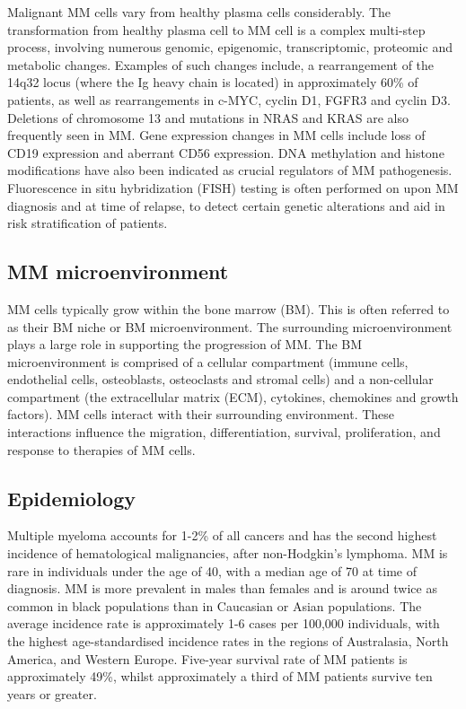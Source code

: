 Malignant MM cells vary from healthy plasma cells considerably.
The transformation from healthy plasma cell to MM cell is a complex multi-step process, involving numerous genomic, epigenomic, transcriptomic, proteomic and metabolic changes\cite{de2002comparison, caprio2020epigenetic, chanukuppa2021proteomic, el2018metabolic}.
Examples of such changes include, a rearrangement of the 14q32 locus (where the Ig heavy chain is located)\cite{nishida1997ig} in approximately 60\% of patients, as well as rearrangements in c-MYC, cyclin D1, FGFR3 and cyclin D3\cite{de2002comparison}.
Deletions of chromosome 13 and mutations in NRAS and KRAS are also frequently seen in MM\@.
Gene expression changes in MM cells include loss of CD19 expression and aberrant CD56 expression.
DNA methylation and histone modifications have also been indicated as crucial regulators of MM pathogenesis.
Fluorescence in situ hybridization (FISH) testing is often performed on upon MM diagnosis and at time of relapse, to detect certain genetic alterations and aid in risk stratification of patients\cite{swerdlow2008classification}.

\subsection{MM microenvironment}
MM cells typically grow within the bone marrow (BM).
This is often referred to as their BM niche or BM microenvironment.
The surrounding microenvironment plays a large role in supporting the progression of MM.
The BM microenvironment is comprised of a cellular compartment (immune cells, endothelial cells, osteoblasts, osteoclasts and stromal cells) and a non-cellular compartment (the extracellular matrix (ECM), cytokines, chemokines and growth factors)\cite{manier2012bone, kawano2015targeting}.
MM cells interact with their surrounding environment.
These interactions influence the migration, differentiation, survival, proliferation, and response to therapies of MM cells.

\subsection{Epidemiology}
Multiple myeloma accounts for 1-2\% of all cancers and has the second highest incidence of hematological malignancies, after non-Hodgkin's lymphoma\cite{international2003criteria}.
MM is rare in individuals under the age of 40, with a median age of 70 at time of diagnosis\cite{tsang2019multiple, palumbo2011multiple}.
MM is more prevalent in males than females and is around twice as common in black populations than in Caucasian or Asian populations\cite{nhsmyeloma}.
The average incidence rate is approximately 1-6 cases per 100,000 individuals\cite{tsang2019multiple, palumbo2011multiple, teras20162016}, with the highest age-standardised incidence rates in the regions of Australasia, North America, and Western Europe\cite{cowan2018global}.
Five-year survival rate of MM patients is approximately 49\%, whilst approximately a third of MM patients survive ten years or greater\cite{cancerresearchuk, siegel2016cancer}.

